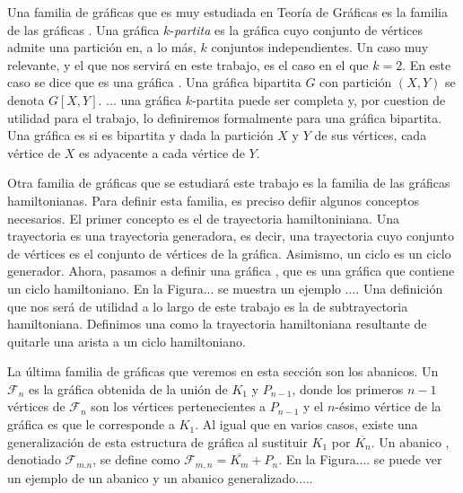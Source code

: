     Una familia de gr\'aficas que es muy estudiada en Teor\'ia de Gr\'aficas es
    la familia de las gr\'aficas . Una
    gr\'afica $k$-\textit{partita} es la gr\'afica cuyo conjunto de v\'ertices
    admite una partici\'on en, a lo m\'as, $k$ conjuntos independientes. Un caso
    muy relevante, y el que nos servir\'a en este trabajo, es el caso en el que
    $k=2$. En este caso se dice que es una gr\'afica
    . Una gr\'afica bipartita $G$ con
    partici\'on $(X,Y)$ se denota $G[X,Y]$. ... una gr\'afica $k$-partita puede
    ser completa y, por cuestion de utilidad para el trabajo, lo definiremos
    formalmente para una gr\'afica bipartita. Una gr\'afica es
     si es bipartita y dada la
    partici\'on $X$ y $Y$ de sus v\'ertices, cada v\'ertice de $X$ es adyacente
    a cada v\'ertice de $Y$. 

    Otra  familia de gr\'aficas que se estudiar\'a este trabajo es la familia de
    las gr\'aficas hamiltonianas. Para definir esta familia, es preciso defiir
    algunos conceptos necesarios. El primer concepto es el de trayectoria
    hamiltoniniana. Una trayectoria  es una
    trayectoria generadora, es decir, una trayectoria cuyo conjunto de
    v\'ertices es el conjunto de v\'ertices de la gr\'afica. Asimismo, un ciclo
     es un ciclo generador. Ahora, pasamos a
    definir una gr\'afica , que es una
    gr\'afica que contiene un ciclo hamiltoniano. En la Figura... se muestra un
    ejemplo .... Una definici\'on que nos ser\'a de utilidad a lo largo de este
    trabajo es la de subtrayectoria hamiltoniana. Definimos una
     como la trayectoria hamiltoniana
    resultante de quitarle una arista a un ciclo hamiltoniano. 

    La \'ultima familia de gr\'aficas que veremos en esta secci\'on son los
    abanicos. Un  $\mathcal{F}_n$ es la gr\'afica obtenida de la
    uni\'on de $K_1$ y $P_{n-1}$, donde los primeros $n-1$ v\'ertices de
    $\mathcal{F}_n$ son los v\'ertices pertenecientes a $P_{n-1}$ y el
    $n$-\'esimo v\'ertice de la gr\'afica es que le corresponde a $K_1$. Al
    igual que en varios casos, existe una generalizaci\'on de esta estructura de
    gr\'afica al sustituir $K_1$ por $\overline{K_n}$. Un abanico
    , denotiado $\mathcal{F}_{m.n}$, se define
    como $\mathcal{F}_{m,n}=\overline{K_m}+P_n$. En la Figura.... se puede ver
    un ejemplo de un abanico y un abanico generalizado.....


